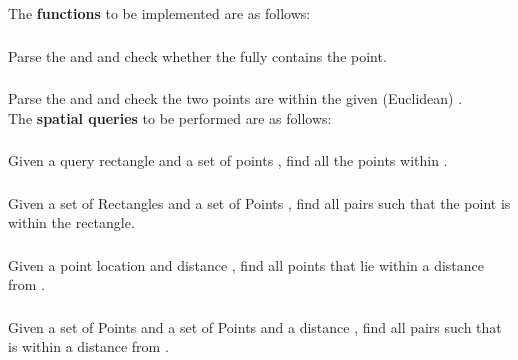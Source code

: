     The \textbf{functions} to be implemented are as follows:
    
    \subsubsection{}
    
    Parse the  and  and check whether the  fully contains the point.
    
    \subsubsection{}
    Parse the  and  and check the two points are within the given (Euclidean) .\\
    
    The \textbf{spatial queries} to be performed are as follows:
    
    \subsubsection{}
    Given a query rectangle  and a set of points , find all the points within .
    
    \subsubsection{}
    Given a set of Rectangles  and a set of Points , find all  pairs such that the point is within the rectangle.
    
    \subsubsection{}
    Given a point location  and distance , find all points that lie within a distance  from .
    
    \subsubsection{}
    Given a set of Points  and a set of Points  and a distance , find all  pairs such that  is within a distance  from .
    

